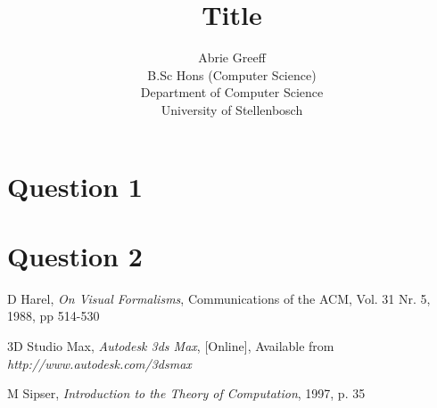 \documentclass[a4paper,11pt,titlepage]{article}
\author{Abrie Greeff\\B.Sc Hons (Computer Science)\\Department of Computer Science\\University of Stellenbosch}
\title{Title}
\begin{document}
\maketitle
\tableofcontents

\section{Question 1}

\section{Question 2}


\begin{thebibliography}{9}
 D Harel,
\emph{On Visual Formalisms}, 
Communications of the ACM, Vol. 31 Nr. 5, 1988, pp 514-530

 3D Studio Max,
\emph{Autodesk 3ds Max},	
[Online], Available from \emph{http://www.autodesk.com/3dsmax }

 M Sipser,
\emph{Introduction to the Theory of Computation},
1997, p. 35


\end{thebibliography}
\end{document}

